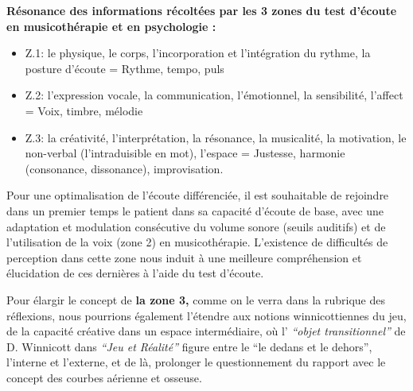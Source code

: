  

       


	\textbf{Résonance des informations récoltées par les 3 
          zones du test d'écoute en musicothérapie et en
  psychologie :}
          
\begin{itemize}
 \item  Z.1: le physique, le corps, l'incorporation et
l'intégration du rythme,
la posture d'écoute  =  Rythme, tempo, puls 

\item  Z.2:  l'expression vocale, la communication,
l'émotionnel, la sensibilité, l'affect = Voix, timbre, mélodie 

\item Z.3: la créativité, l'interprétation, la
résonance, la musicalité, la motivation, le non-verbal (l'intraduisible en mot), l'espace = Justesse, harmonie (consonance,
dissonance), improvisation.
\end{itemize}


Pour une optimalisation de l'écoute différenciée, il est souhaitable
de rejoindre dans un premier temps  le patient dans sa capacité
d'écoute de base, avec une adaptation et modulation consécutive du
volume sonore (seuils auditifs) et de l'utilisation de la voix (zone
2) en musicothérapie.
L'existence de difficultés de perception dans cette zone nous
induit à une meilleure compréhension et  élucidation de ces dernières à l'aide du
test d'écoute.

Pour élargir le concept de\textbf{ la zone 3,} comme on le
verra dans la rubrique des réflexions, nous pourrions 
également l'étendre aux notions winnicottiennes du jeu, de la capacité
créative dans un espace
intermédiaire, où l' \textit{``objet
transitionnel'' } de D. Winnicott dans \textit{``Jeu et Réalité''}
\autocite{winnicott} 
figure entre le ``le
dedans et le
dehors'',
l'interne et l'externe, et de là,  prolonger le questionnement du
rapport avec le concept des
courbes aérienne et osseuse.



